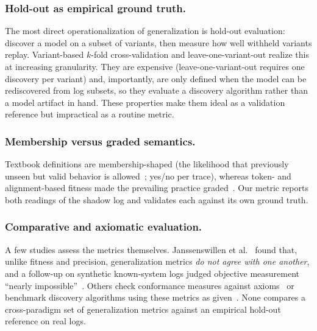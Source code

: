 \documentclass[runningheads]{llncs}
\newcommand{\chg}[1]{\textcolor{chgblue}{#1}}
\begin{document}
\subsubsection{Hold-out as empirical ground truth.}
The most direct operationalization of generalization is hold-out evaluation: discover a model on a subset of variants, then measure how well withheld variants replay. Variant-based $k$-fold cross-validation and leave-one-variant-out realize this at increasing granularity. They are expensive (leave-one-variant-out requires one discovery per variant) and, importantly, are only defined when the model can be rediscovered from log subsets, so they evaluate a discovery algorithm rather than a model artifact in hand. These properties make them ideal as a validation reference but impractical as a routine metric.

\subsubsection{Membership versus graded semantics.}
Textbook definitions are membership-shaped \chg{(the likelihood that previously unseen but valid behavior is allowed~\cite{vanderaalst2016pm}; yes/no per trace)}, whereas token- and alignment-based fitness made the prevailing practice graded~\cite{rozinat2008conformance}. Our metric reports both readings of the shadow log and validates each against its own ground truth.

\subsubsection{Comparative and axiomatic evaluation.}
A few studies assess the metrics themselves. Janssenswillen et al.~\cite{janssenswillen2017comparative} found that, unlike fitness and precision, generalization metrics \emph{do not agree with one another}, and a follow-up on synthetic known-system logs judged objective measurement ``nearly impossible''~\cite{janssenswillen2019confirmatory}. Others check conformance measures against axioms~\cite{vanderaalst2018propositions,syring2019conformance} or benchmark discovery algorithms using these metrics as given~\cite{augusto2019benchmark}. None compares a cross-paradigm set of generalization metrics against an empirical hold-out reference on real logs.
\end{document}

